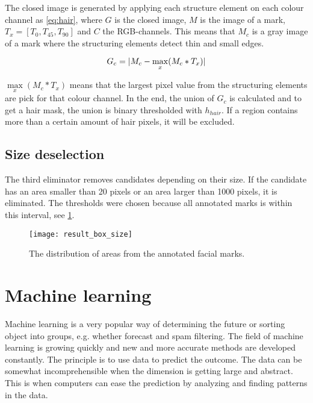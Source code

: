 The closed image is generated by applying each structure element on each colour channel as \eqref{eq:hair}, where $G$ is the closed image, $M$ is the image of a mark, $T_x = [T_{0}, T_{45}, T_{90} ]$ and $C$ the RGB-channels. This means that $M_c$ is a gray image of a mark where the structuring elements detect thin and small edges.    

\begin{equation} \label{eq:hair}
G_c = \lvert M_c - \max_{x}(M_c * T_x)\rvert 
\end{equation}

$\max\limits_x(M_c * T_x)$ means that the largest pixel value from the structuring elements are pick for that colour channel. In the end, the union of $G_c$ is calculated and to get a hair mask, the union is binary thresholded with $h_{hair}$. If a region contains more than a certain amount of hair pixels, it will be excluded.

\subsection{Size deselection}

The third eliminator removes candidates depending on their size. If the candidate has an area smaller than 20 pixels or an area larger than 1000 pixels, it is eliminated. The thresholds were chosen because all annotated marks is within this interval, see \cref{fig:result_box_size}.


\FloatBarrier
\begin{figure}[!h]
	\centering
	\texttt{[image: result\_box\_size]}
	\caption{The distribution of areas from the annotated facial marks.  \label{fig:result_box_size}}
\end{figure}
\FloatBarrier

\section{Machine learning}

Machine learning is a very popular way of determining the future or sorting object into groups, e.g. whether forecast and spam filtering. The field of machine learning is growing quickly and new and more accurate methods are developed constantly. The principle is to use data to predict the outcome. The data can be somewhat incomprehensible when the dimension is getting large and abstract. This is when computers can ease the prediction by analyzing and finding patterns in the data. 

